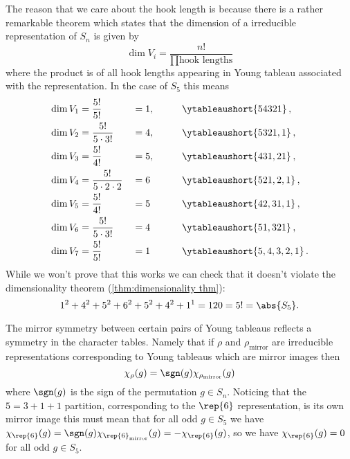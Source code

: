 The reason that we care about the hook length is because there is a rather
remarkable theorem which states that the dimension of a irreducible
representation of \(S_n\) is given by
\begin{equation}
    \dim V_i = \frac{n!}{\prod \text{hook lengths}}
\end{equation}
where the product is of all hook lengths appearing in Young tableau
associated with the representation.
In the case of \(S_5\) this means
\begin{alignat}{5}
    \dim V_1 &= \frac{5!}{5!} &&= 1, \qquad &&\ytableaushort{54321}\,,\\
    \dim V_2 &= \frac{5!}{5\cdot 3!} &&= 4, \qquad &&
    \ytableaushort{5321,1}\,,\\
    \dim V_3 &= \frac{5!}{4!} &&= 5, \qquad && \ytableaushort{431,21}\,,\\
    \dim V_4 &= \frac{5!}{5\cdot 2 \cdot 2} &&= 6\qquad
    &&\ytableaushort{521,2,1}\,,\\
    \dim V_5 &= \frac{5!}{4!} &&= 5 \qquad &&\ytableaushort{42,31,1}\,,\\
    \dim V_6 &= \frac{5!}{5\cdot 3!} &&= 4 \qquad
    &&\ytableaushort{51,321}\,,\\
    \dim V_7 &= \frac{5!}{5!} &&= 1 \qquad && \ytableaushort{5,4,3,2,1}\,.
\end{alignat}
While we won't prove that this works we can check that it doesn't violate
the dimensionality theorem (\cref{thm:dimensionality thm}):
\begin{equation}
    1^2 + 4^2 + 5^2 + 6^2 + 5^2 + 4^2 + 1^1 = 120 = 5! = \abs{S_5}.
\end{equation}

The mirror symmetry between certain pairs of Young tableaus reflects a
symmetry in the character tables.
Namely that if \(\rho\) and \(\rho_{\mathrm{mirror}}\) are irreducible
representations corresponding to Young tableaus which are mirror images then
\begin{equation}
    \chi_{\rho}(g) = \sgn(g)\chi_{\rho_{\mathrm{mirror}}}(g)
\end{equation}
where \(\sgn(g)\) is the sign of the permutation \(g \in S_n\).
Noticing that the \(5 = 3 + 1 + 1\) partition, corresponding to the
\(\rep{6}\) representation, is its own mirror image this must mean that for all
odd \(g \in S_5\) we have \(\chi_{\rep{6}}(g) =
\sgn(g)\chi_{\rep{6}_{\mathrm{mirror}}}(g) = -\chi_{\rep{6}}(g)\), so we have
\(\chi_{\rep{6}}(g) = 0\) for all odd \(g \in S_5\).

